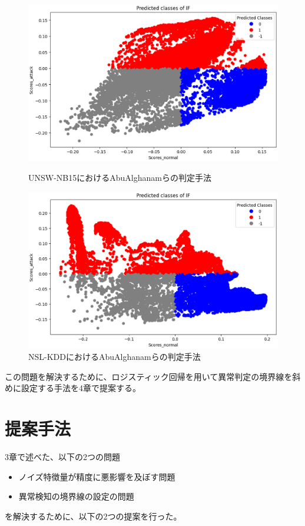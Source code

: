 \documentclass{css}
\begin{document}
\begin{figure}[ht]
    \centering
    \begin{minipage}{0.9\linewidth}
        \centering
        \includegraphics[width=\linewidth]{pictures/eps/UNSW-NB152.eps}
        \caption{UNSW-NB15におけるAbuAlghanamらの判定手法}
        \label{fig:UNSW-NB152}
    \end{minipage}
    \vfill{} 
    \begin{minipage}{0.9\linewidth}
        \centering
        \includegraphics[width=\linewidth]{pictures/eps/NSL-KDD2.eps}
        \caption{NSL-KDDにおけるAbuAlghanamらの判定手法}
        \label{fig:NSL-KDD2}
    \end{minipage}
\end{figure}

この問題を解決するために、ロジスティック回帰を用いて異常判定の境界線を斜めに設定する手法を4章で提案する。

\section{提案手法}
3章で述べた、以下の2つの問題
\begin{itemize}
    \item ノイズ特徴量が精度に悪影響を及ぼす問題
    \item 異常検知の境界線の設定の問題
\end{itemize}
を解決するために、以下の2つの提案を行った。
\end{document}
